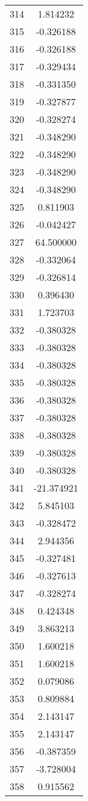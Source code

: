 \documentclass[12pt]{article}
\begin{document}
\begin{longtable}{@{}cc@{}}
314 & 1.814232 \\
315 & -0.326188 \\
316 & -0.326188 \\
317 & -0.329434 \\
318 & -0.331350 \\
319 & -0.327877 \\
320 & -0.328274 \\
321 & -0.348290 \\
322 & -0.348290 \\
323 & -0.348290 \\
324 & -0.348290 \\
325 & 0.811903 \\
326 & -0.042427 \\
327 & 64.500000 \\
328 & -0.332064 \\
329 & -0.326814 \\
330 & 0.396430 \\
331 & 1.723703 \\
332 & -0.380328 \\
333 & -0.380328 \\
334 & -0.380328 \\
335 & -0.380328 \\
336 & -0.380328 \\
337 & -0.380328 \\
338 & -0.380328 \\
339 & -0.380328 \\
340 & -0.380328 \\
341 & -21.374921 \\
342 & 5.845103 \\
343 & -0.328472 \\
344 & 2.944356 \\
345 & -0.327481 \\
346 & -0.327613 \\
347 & -0.328274 \\
348 & 0.424348 \\
349 & 3.863213 \\
350 & 1.600218 \\
351 & 1.600218 \\
352 & 0.079086 \\
353 & 0.809884 \\
354 & 2.143147 \\
355 & 2.143147 \\
356 & -0.387359 \\
357 & -3.728004 \\
358 & 0.915562 \\

\end{longtable}
\end{document}
